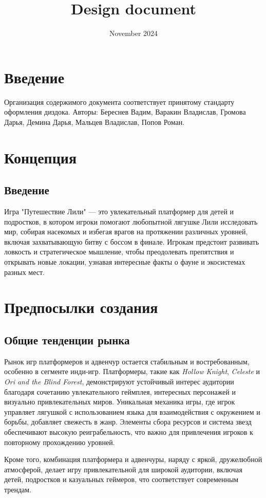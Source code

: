 \documentclass{article}
\title{Design document}
\date{November 2024}
\begin{document}
\section{Введение}
Организация содержимого документа соответствует принятому стандарту оформления диздока.
Авторы: Береснев Вадим, Варакин Владислав, Громова Дарья, Демина Дарья, Мальцев Владислав, Попов Роман.

\section{Концепция}
\subsection{Введение}
Игра "Путешествие Лили" — это увлекательный платформер для детей и подростков, в котором игроки помогают любопытной лягушке Лили исследовать мир, собирая насекомых и избегая врагов на протяжении различных уровней, включая захватывающую битву с боссом в финале. Игрокам предстоит развивать ловкость и стратегическое мышление, чтобы преодолевать препятствия и открывать новые локации, узнавая интересные факты о фауне и экосистемах разных мест.

\section*{Предпосылки создания}

\subsection*{Общие тенденции рынка}

Рынок игр платформеров и адвенчур остается стабильным и востребованным, особенно в сегменте инди-игр. Платформеры, такие как \textit{Hollow Knight}, \textit{Celeste} и \textit{Ori and the Blind Forest}, демонстрируют устойчивый интерес аудитории благодаря сочетанию увлекательного геймплея, интересных персонажей и визуально привлекательных миров. Уникальная механика игры, где игрок управляет лягушкой с использованием языка для взаимодействия с окружением и борьбы, добавляет свежесть в жанр. Элементы сбора ресурсов и система звезд обеспечивают высокую реиграбельность, что важно для привлечения игроков к повторному прохождению уровней. 

Кроме того, комбинация платформера и адвенчуры, наряду с яркой, дружелюбной атмосферой, делает игру привлекательной для широкой аудитории, включая детей, подростков и казуальных геймеров, что соответствует современным трендам.
\end{document}
